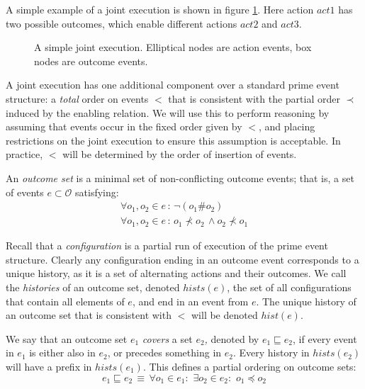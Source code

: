 A simple example of a joint execution is shown in figure \ref{fig:example-je}.
Here action $act1$ has two possible outcomes, which enable different
actions $act2$ and $act3$.

%
\begin{figure}

\caption{ A simple joint execution. Elliptical nodes are action events, box
nodes are outcome events. }


\label{fig:example-je} 
\end{figure}


A joint execution has one additional component over a standard prime
event structure: a \emph{total} order on events $<$ that is consistent
with the partial order $\prec$ induced by the enabling relation.
We will use this to perform reasoning by assuming that events occur
in the fixed order given by $<$, and placing restrictions on the
joint execution to ensure this assumption is acceptable. In practice,
$<$ will be determined by the order of insertion of events.

An \emph{outcome set} is a minimal set of non-conflicting outcome
events; that is, a set of events $e\subset\mathcal{O}$ satisfying:\begin{gather*}
\forall o_{1},o_{2}\in e\,:\,\neg(o_{1}\#o_{2})\\
\forall o_{1},o_{2}\in e\,:\, o_{1}\not\prec o_{2}\,\wedge o_{2}\not\prec o_{1}\end{gather*}


Recall that a \emph{configuration} is a partial run of execution of
the prime event structure. Clearly any configuration ending in an
outcome event corresponds to a unique history, as it is a set of alternating
actions and their outcomes. We call the \emph{histories} of an outcome
set, denoted $hists(e)$, the set of all configurations that contain
all elements of $e$, and end in an event from $e$. The unique history
of an outcome set that is consistent with $<$ will be denoted $hist(e)$.

We say that an outcome set $e_{1}$ \emph{covers} a set \emph{$e_{2}$,}
denoted by $e_{1}\sqsubseteq e_{2}$, if every event in $e_{1}$ is
either also in $e_{2}$, or precedes something in $e_{2}$. Every
history in $hists(e_{2})$ will have a prefix in $hists(e_{1})$.
This defines a partial ordering on outcome sets:\[
e_{1}\sqsubseteq e_{2}\,\equiv\,\forall o_{1}\in e_{1}:\,\,\exists o_{2}\in e_{2}:\,\, o_{1}\preceq o_{2}\]


